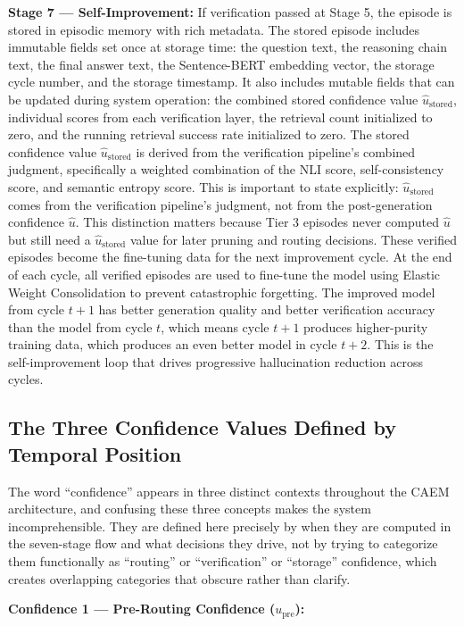 \documentclass[11pt,a4paper]{article}
\newcommand{\uhat}{\hat{u}}
\newcommand{\upre}{u_{\text{pre}}}
\newcommand{\ustored}{\hat{u}_{\text{stored}}}
\begin{document}
\textbf{Stage 7 — Self-Improvement:} If verification passed at Stage 5, the episode is stored in episodic memory with rich metadata. The stored episode includes immutable fields set once at storage time: the question text, the reasoning chain text, the final answer text, the Sentence-BERT embedding vector, the storage cycle number, and the storage timestamp. It also includes mutable fields that can be updated during system operation: the combined stored confidence value $\ustored$, individual scores from each verification layer, the retrieval count initialized to zero, and the running retrieval success rate initialized to zero. The stored confidence value $\ustored$ is derived from the verification pipeline's combined judgment, specifically a weighted combination of the NLI score, self-consistency score, and semantic entropy score. This is important to state explicitly: $\ustored$ comes from the verification pipeline's judgment, not from the post-generation confidence $\uhat$. This distinction matters because Tier 3 episodes never computed $\uhat$ but still need a $\ustored$ value for later pruning and routing decisions. These verified episodes become the fine-tuning data for the next improvement cycle. At the end of each cycle, all verified episodes are used to fine-tune the model using Elastic Weight Consolidation to prevent catastrophic forgetting. The improved model from cycle $t+1$ has better generation quality and better verification accuracy than the model from cycle $t$, which means cycle $t+1$ produces higher-purity training data, which produces an even better model in cycle $t+2$. This is the self-improvement loop that drives progressive hallucination reduction across cycles.

\subsection{The Three Confidence Values Defined by Temporal Position}

The word ``confidence'' appears in three distinct contexts throughout the CAEM architecture, and confusing these three concepts makes the system incomprehensible. They are defined here precisely by when they are computed in the seven-stage flow and what decisions they drive, not by trying to categorize them functionally as ``routing'' or ``verification'' or ``storage'' confidence, which creates overlapping categories that obscure rather than clarify.

\textbf{Confidence 1 — Pre-Routing Confidence ($\upre$):}
\end{document}
